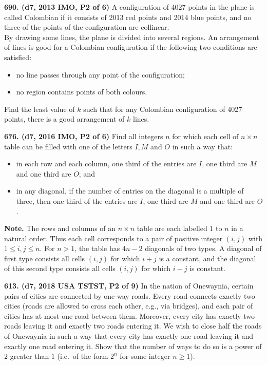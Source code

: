 \documentclass{article}
\begin{document}
\textbf{690. (\color{red}d7\color{black}, 2013 IMO, P2 of 6)} A configuration of 4027 points in the plane is called Colombian if it consists of 2013 red points and 2014 blue points, and no three of the points of the configuration are collinear. \\By drawing some lines, the plane is divided into several regions. An arrangement of lines is good for a Colombian configuration if the following two conditions are satisfied:
\begin{itemize}
        \item no line passes through any point of the configuration;
        \item no region contains points of both colours.
\end{itemize}
Find the least value of $k$ such that for any Colombian configuration of 4027 points, there is a good arrangement of $k$ lines.

\textbf{676. (\color{red}d7\color{black}, 2016 IMO, P2 of 6)} Find all integers $n$ for which each cell of $n \times n$ table can be filled with one of the letters $I,M$ and $O$ in such a way that:\begin{itemize}\item in each row and each column, one third of the entries are $I$, one third are $M$ and one third are $O$; and\item in any diagonal, if the number of entries on the diagonal is a multiple of three, then one third of the entries are $I$, one third are $M$ and one third are $O$.\end{itemize}\textbf{Note.} The rows and columns of an $n \times n$ table are each labelled $1$ to $n$ in a natural order. Thus each cell corresponds to a pair of positive integer $(i,j)$ with $1 \le i,j \le n$. For $n>1$, the table has $4n-2$ diagonals of two types. A diagonal of first type consists all cells $(i,j)$  for which $i+j$ is a constant, and the diagonal of this second type consists all cells $(i,j)$ for which $i-j$ is constant.

\textbf{613. (\color{red}d7\color{black}, 2018 USA TSTST, P2 of 9)} In the nation of Onewaynia, certain pairs of cities are connected by one-way roads. Every road connects exactly two cities (roads are allowed to cross each other, e.g., via bridges), and each pair of cities has at most one road between them. Moreover, every city has exactly two roads leaving it and exactly two roads entering it.
\bigbreak
We wish to close half the roads of Onewaynia in such a way that every city has exactly one road leaving it and exactly one road entering it. Show that the number of ways to do so is a power of $2$ greater than $1$ (i.e.\ of the form $2^n$ for some integer $n \ge 1$).
\end{document}
